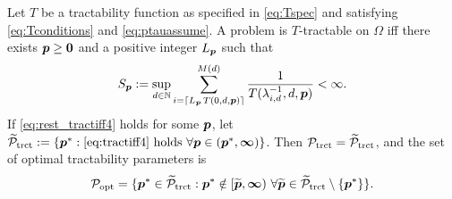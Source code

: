 \documentclass[11pt,a4paper]{article}
\begin{document}
\begin{theorem}\label{thm_main_rest_tract2}
Let $T$ be a tractability function as specified in \eqref{eq:Tspec} and satisfying \eqref{eq:Tconditions} and \eqref{eq:ptauassume}.  A problem is $T$-tractable on $\Omega$ iff there exists $\boldsymbol{p}\ge \boldsymbol{0}$ and a positive integer $L_{\boldsymbol{p}}$ such that
\begin{equation} \label{eq:rest_tractiff4}
     S_{\boldsymbol{p}}:=\sup_{d \in \mathbb{N}}
     \sum_{i = \lceil L_{\boldsymbol{p}}\, T(0,d,\boldsymbol{p}) \rceil}^{M(d)} \frac{1}{T(\lambda^{-1}_{i,d},d,\boldsymbol{p})}< \infty.
\end{equation}
If \eqref{eq:rest_tractiff4} holds for some $\boldsymbol{p}$, let $\widetilde{\mathcal{P}}_{\textup{trct}} : = \{\boldsymbol{p}^* : \eqref{eq:tractiff4} \text{ holds }\forall \boldsymbol{p} \in (\boldsymbol{p}^*,\boldsymbol{\infty}) \}$.
Then $\mathcal{P}_{\textup{trct}} = \widetilde{\mathcal{P}}_{\textup{trct}}$, and the set of optimal  tractability parameters is
\[
\mathcal{P}_{\textup{opt}} =
\{\boldsymbol{p}^* \in \widetilde{\mathcal{P}}_{\textup{trct}} :  \boldsymbol{p}^* \notin [\widetilde{\boldsymbol{p}},\boldsymbol{\infty}) \ \forall \widetilde{\boldsymbol{p}}\in  \widetilde{\mathcal{P}}_{\textup{trct}} \setminus \{\boldsymbol{p}^*\} \}.
\]
\end{theorem}
\end{document}
